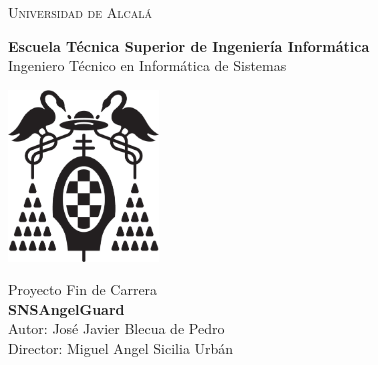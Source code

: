 
\begin{center}
\Large \textsc{Universidad de Alcalá}\\
\vspace{0.5cm}

\textbf{Escuela Técnica Superior de Ingeniería Informática}\\

Ingeniero Técnico en Informática de Sistemas\\
\end{center}

\vspace{0.5cm}

\begin{center}
\includegraphics[width=4cm]{Figuras/LogoUAH.eps}\\
\end{center}


\begin{center}
\vspace{1cm}

\Large Proyecto Fin de Carrera\\
\textbf{\Large {{SNSAngelGuard}}}\\
\vspace{1cm}
\large Autor: José Javier Blecua de Pedro\\
Director: Miguel Angel Sicilia Urbán\\
\vspace{0.5cm}
\end{center}

